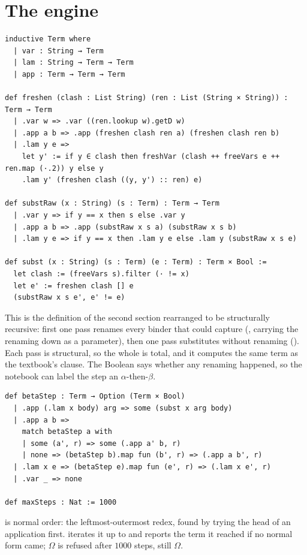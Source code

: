 \section{The engine}

\begin{verbatim}
inductive Term where
  | var : String → Term
  | lam : String → Term → Term
  | app : Term → Term → Term

def freshen (clash : List String) (ren : List (String × String)) : Term → Term
  | .var w => .var ((ren.lookup w).getD w)
  | .app a b => .app (freshen clash ren a) (freshen clash ren b)
  | .lam y e =>
    let y' := if y ∈ clash then freshVar (clash ++ freeVars e ++ ren.map (·.2)) y else y
    .lam y' (freshen clash ((y, y') :: ren) e)

def substRaw (x : String) (s : Term) : Term → Term
  | .var y => if y == x then s else .var y
  | .app a b => .app (substRaw x s a) (substRaw x s b)
  | .lam y e => if y == x then .lam y e else .lam y (substRaw x s e)

def subst (x : String) (s : Term) (e : Term) : Term × Bool :=
  let clash := (freeVars s).filter (· != x)
  let e' := freshen clash [] e
  (substRaw x s e', e' != e)
\end{verbatim}

This is the definition of the second section rearranged to be structurally recursive: first one
pass renames every binder that could capture (, carrying the renaming down as a
parameter), then one pass substitutes without renaming (). Each pass is structural,
so the whole is total, and it computes the same term as the textbook's clause. The Boolean says
whether any renaming happened, so the notebook can label the step an $\alpha$-then-$\beta$.

\begin{verbatim}
def betaStep : Term → Option (Term × Bool)
  | .app (.lam x body) arg => some (subst x arg body)
  | .app a b =>
    match betaStep a with
    | some (a', r) => some (.app a' b, r)
    | none => (betaStep b).map fun (b', r) => (.app a b', r)
  | .lam x e => (betaStep e).map fun (e', r) => (.lam x e', r)
  | .var _ => none

def maxSteps : Nat := 1000
\end{verbatim}

 is normal order: the leftmost-outermost redex, found by trying the head of an
application first.  iterates it up to  and reports the term it reached if
no normal form came; $\Omega$ is refused after $1000$ steps, still $\Omega$.

